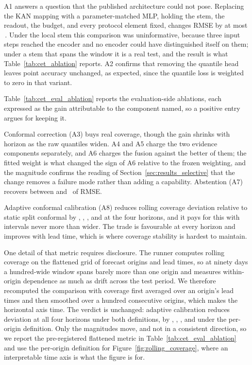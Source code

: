 A1 answers a question that the published architecture could not pose. Replacing the KAN mapping with a parameter-matched MLP, holding the stem, the readout, the budget, and every protocol element fixed, changes RMSE by at most \ablationKanGapMax{}\,\degC{}. Under the local stem this comparison was uninformative, because three input steps reached the encoder and no encoder could have distinguished itself on them; under a stem that spans the window it is a real test, and the result is what Table~\ref{tab:cet_ablation} reports. A2 confirms that removing the quantile head leaves point accuracy unchanged, as expected, since the quantile loss is weighted to zero in that variant.

Table~\ref{tab:cet_eval_ablation} reports the evaluation-side ablations, each expressed as the gain attributable to the component named, so a positive entry argues for keeping it.


Conformal correction (A3) buys real coverage, though the gain shrinks with horizon as the raw quantiles widen. A4 and A5 charge the two evidence components separately, and A6 charges the fusion against the better of them; the fitted weight is what changed the sign of A6 relative to the frozen weighting, and the magnitude confirms the reading of Section~\ref{sec:results_selective} that the change removes a failure mode rather than adding a capability. Abstention (A7) recovers between \abstainGainLow{} and \abstainGainHigh{}\,\degC{} of RMSE.

Adaptive conformal calibration (A8) reduces rolling coverage deviation relative to static split conformal by \adaptiveDevDropOne{}, \adaptiveDevDropSeven{}, \adaptiveDevDropThirty{}, and \adaptiveDevDropNinety{} at the four horizons, and it pays for this with intervals never more than \adaptiveWidthCostThirty{} wider. The trade is favourable at every horizon and improves with lead time, which is where coverage stability is hardest to maintain.

One detail of that metric requires disclosure. The runner computes rolling coverage on the flattened grid of forecast origins and lead times, so at ninety days a hundred-wide window spans barely more than one origin and measures within-origin dependence as much as drift across the test period. We therefore recomputed the comparison with coverage first averaged over an origin's lead times and then smoothed over a hundred consecutive origins, which makes the horizontal axis time. The verdict is unchanged: adaptive calibration reduces deviation at all four horizons under both definitions, by \adaptiveOriginDropOne{}, \adaptiveOriginDropSeven{}, \adaptiveOriginDropThirty{}, and \adaptiveOriginDropNinety{} under the per-origin definition. Only the magnitudes move, and not in a consistent direction, so we report the pre-registered flattened metric in Table~\ref{tab:cet_eval_ablation} and use the per-origin definition for Figure~\ref{fig:rolling_coverage}, where an interpretable time axis is what the figure is for.

